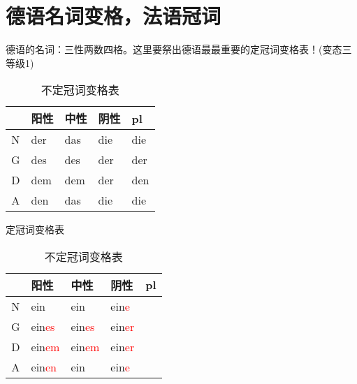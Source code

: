 \documentclass[12pt,A4paper,oneside,reqno]{amsart}
\numberwithin{equation}{section}
\theoremstyle{plain}
\theoremstyle{plain}
\theoremstyle{plain}
\numberwithin{equation}{section}
\theoremstyle{remark}
\begin{document}
\section{德语名词变格，法语冠词}
德语的名词：三性两数四格。这里要祭出德语最最重要的定冠词变格表！(变态三等级1)
\begin{table}[th]
	\begin{minipage}[t]{0.48\textwidth}
		\centering
		\begin{tabular}{c|l|l|l|l}
			\hline							
			&	阳性	&	中性	&	阴性	&	pl	\\
			\hline									
			N	&	der	&	das	&	die	&	die	\\
			G	&	des	&	des	&	der	&	der	\\
			D	&	dem	&	dem	&	der	&	den	\\
			A	&	den	&	das	&	die	&	die	\\
			
			
			\hline						
		\end{tabular}
		\vspace{0.5cm}
		\caption{定冠词变格表}
	\end{minipage}
	\begin{minipage}[t]{0.48\textwidth}
		\centering
		\begin{tabular}{c|l|l|l|l}
			\hline									
			&	阳性	&	中性	&	阴性	&	pl	\\
			\hline									
			N	&	ein	&	ein	&	ein\textcolor{red}{e}	&		\\
			G	&	ein\textcolor{red}{es}	&	ein\textcolor{red}{es}	&	ein\textcolor{red}{er}	&		\\
			D	&	ein\textcolor{red}{em}	&	ein\textcolor{red}{em}	&	ein\textcolor{red}{er}	&		\\
			A	&	ein\textcolor{red}{en}	&	ein	&	ein\textcolor{red}{e}	&		\\
			
			
			\hline									
			
		\end{tabular}
		
		\vspace{0.5cm}
		\caption{不定冠词变格表}
	\end{minipage}
\end{table}
\end{document}
